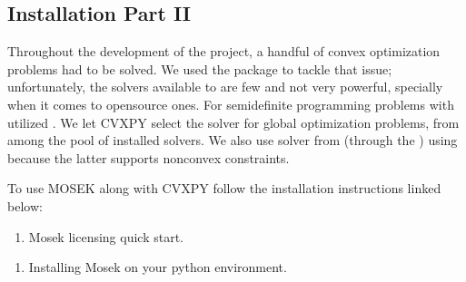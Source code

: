 \documentclass[letterpaper,10pt,english]{sphinxmanual}
\begin{document}
\subsection{Installation \sphinxhyphen{} Part II}
\label{\detokenize{quickstartdocs:installation-part-ii}}
Throughout the development of the project, a handful of convex optimization
problems had to be solved. We used the  package to tackle that issue;
unfortunately, the solvers available to  are few and not very powerful,
specially when it comes to open\sphinxhyphen{}source ones. For semi\sphinxhyphen{}definite programming
problems with utilized . We let CVXPY select the solver for global
optimization problems, from among the pool of installed solvers. We also use
 solver from  (through the ) using  because
the latter supports non\sphinxhyphen{}convex constraints.

To use MOSEK along with CVXPY follow the installation instructions linked below:
\begin{enumerate}
%
\item {} 
Mosek licensing quick start.

\end{enumerate}

\begin{DUlineblock}{0em}
\item[] \sphinxhyphen{} 
\end{DUlineblock}
\begin{enumerate}
%
\setcounter{enumi}{1}
\item {} 
Installing Mosek on your python environment.

\end{enumerate}

\begin{DUlineblock}{0em}
\item[] \sphinxhyphen{} 
\end{DUlineblock}
\end{document}
